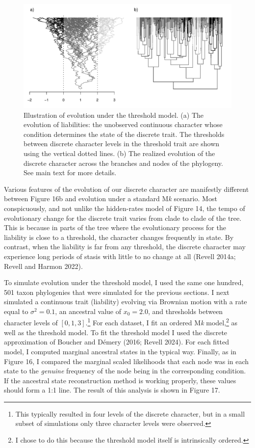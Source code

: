 \documentclass{article}
\begin{document}
\begin{figure}
\includegraphics[width=1\linewidth]{Revell.AncestralReconstruction_files/figure-latex/fig16-1} \caption{Illustration of evolution under the threshold model. (a) The evolution of liabilities: the unobserved continuous character whose condition determines the state of the discrete trait. The thresholds between discrete character levels in the threshold trait are shown using the vertical dotted lines. (b) The realized evolution of the discrete character across the branches and nodes of the phylogeny. See main text for more details.}\label{fig:fig16}
\end{figure}

Various features of the evolution of our discrete character are manifestly different between Figure 16b and evolution under a standard M\emph{k} scenario. Most conspicuously, and not unlike the hidden-rates model of Figure 14, the tempo of evolutionary change for the discrete trait varies from clade to clade of the tree. This is because in parts of the tree where the evolutionary process for the liability is close to a threshold, the character changes frequently in state. By contrast, when the liability is far from any threshold, the discrete character may experience long periods of stasis with little to no change at all (Revell 2014a; Revell and Harmon 2022).

To simulate evolution under the threshold model, I used the same one hundred, 501 taxon phylogenies that were simulated for the previous sections. I next simulated a continuous trait (liability) evolving via Brownian motion with a rate equal to \(\sigma^2 = 0.1\), an ancestral value of \(x_0 = 2.0\), and thresholds between character levels of \([0, 1, 3]\).\footnote{This typically resulted in four levels of the discrete character, but in a small subset of simulations only three character levels were observed.} For each dataset, I fit an ordered M\emph{k} model,\footnote{I chose to do this because the threshold model itself is intrinsically ordered.} as well as the threshold model. To fit the threshold model I used the discrete approximation of Boucher and Démery (2016; Revell 2024). For each fitted model, I computed marginal ancestral states in the typical way. Finally, as in Figure 16, I compared the marginal scaled likelihoods that each node was in each state to the \emph{genuine} frequency of the node being in the corresponding condition. If the ancestral state reconstruction method is working properly, these values should form a 1:1 line. The result of this analysis is shown in Figure 17.
\end{document}
